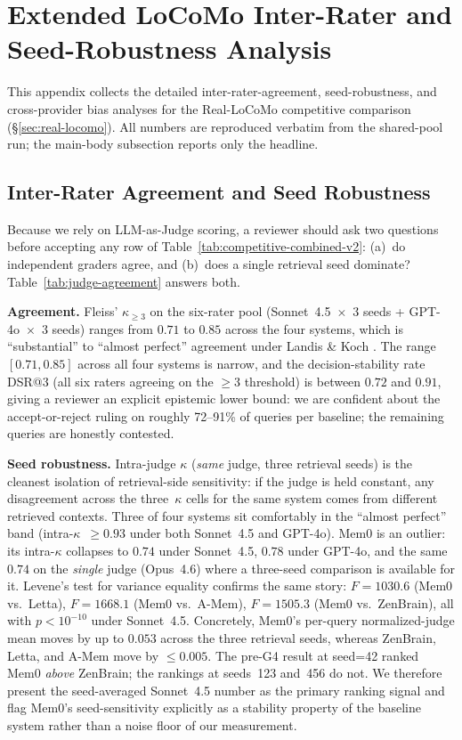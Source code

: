 \documentclass{article}
\begin{document}
\section{Extended LoCoMo Inter-Rater and Seed-Robustness Analysis}
\label{app:extended-locomo-judge}

This appendix collects the detailed inter-rater-agreement, seed-robustness,
and cross-provider bias analyses for the Real-LoCoMo competitive comparison
(\S\ref{sec:real-locomo}). All numbers are reproduced verbatim from the
shared-pool run; the main-body subsection reports only the headline.

\subsection{Inter-Rater Agreement and Seed Robustness}
\label{sec:seed-robustness}

Because we rely on LLM-as-Judge scoring, a reviewer should ask
two questions before accepting any row of
Table~\ref{tab:competitive-combined-v2}: (a)~do independent
graders agree, and (b)~does a single retrieval seed dominate?
Table~\ref{tab:judge-agreement} answers both.



\textbf{Agreement.}
Fleiss' $\kappa_{\geq 3}$ on the six-rater pool
(Sonnet~4.5~$\times$~3 seeds + GPT-4o~$\times$~3 seeds) ranges
from $0.71$ to $0.85$ across the four systems, which is ``substantial''
to ``almost perfect'' agreement under Landis \& Koch \citep{landis1977}.
The range $[0.71, 0.85]$ across all four systems is narrow, and the
decision-stability rate DSR@3 (all six raters agreeing on the
$\geq 3$ threshold) is between $0.72$ and $0.91$, giving a
reviewer an explicit epistemic lower bound: we are confident about
the accept-or-reject ruling on roughly 72--91\% of queries per
baseline; the remaining queries are honestly contested.

\textbf{Seed robustness.}
Intra-judge $\kappa$ (\emph{same} judge, three retrieval seeds) is the
cleanest isolation of retrieval-side sensitivity: if the judge is
held constant, any disagreement across the three~$\kappa$ cells for
the same system comes from different retrieved contexts.
Three of four systems sit comfortably in the ``almost perfect''
band (intra-$\kappa$~$\geq 0.93$ under both Sonnet~4.5 and GPT-4o).
Mem0 is an outlier: its intra-$\kappa$ collapses to $0.74$
under Sonnet~4.5, $0.78$ under GPT-4o, and the same~$0.74$ on the
\emph{single} judge (Opus~4.6) where a three-seed comparison is
available for it.
Levene's test for variance equality confirms the same story:
$F = 1030.6$ (Mem0 vs.\ Letta), $F = 1668.1$ (Mem0 vs.\ A-Mem),
$F = 1505.3$ (Mem0 vs.\ ZenBrain), all with $p < 10^{-10}$ under
Sonnet~4.5.
Concretely, Mem0's per-query normalized-judge mean moves
by up to $0.053$ across the three retrieval seeds, whereas ZenBrain,
Letta, and A-Mem move by $\leq 0.005$.
The pre-G4 result at seed=42 ranked Mem0 \emph{above}
ZenBrain; the rankings at seeds~123 and~456 do not.
We therefore present the seed-averaged Sonnet~4.5 number as the
primary ranking signal and flag Mem0's seed-sensitivity
explicitly as a stability property of the baseline system rather
than a noise floor of our measurement.
\end{document}
